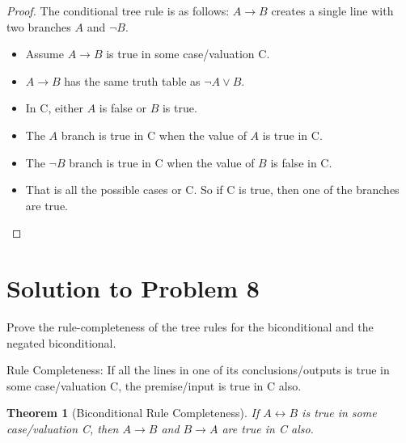 \documentclass[12pt]{article}
\newtheorem{theorem}{Theorem}
\begin{document}
\begin{proof}
    The conditional tree rule is as follows: $A \rightarrow B$ creates a single line with two branches $A$ and $\neg B$. 
    \begin{itemize}
        \item Assume $A \rightarrow B$ is true in some case/valuation C.
        \item $A \rightarrow B$ has the same truth table as $\neg A \lor B$.
        \item In C, either $A$ is false or $B$ is true.
        \item The $A$ branch is true in C when the value of $A$ is true in C.
        \item The $\neg B$ branch is true in C when the value of $B$ is false in C.
        \item That is all the possible cases or C. So if C is true, then one of the branches are true. 
    \end{itemize}
\end{proof}


\section*{Solution to Problem 8}
 Prove the rule-completeness of the tree rules for the biconditional and the negated biconditional.  
 
Rule Completeness:  If all the lines in one of its conclusions/outputs  is true in some case/valuation C, the premise/input is true in C also.


\begin{theorem}[Biconditional Rule Completeness]
    If $A \leftrightarrow B$ is true in some case/valuation C, then $A \rightarrow B$ and $B \rightarrow A$ are true in C also.
\end{theorem}
\end{document}
